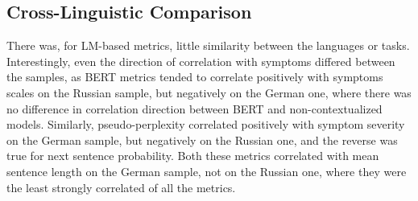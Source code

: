 

\subsection{Cross-Linguistic Comparison}









There was, for LM-based metrics, little similarity between the languages or tasks. Interestingly, even the direction of correlation with symptoms differed between the samples, as BERT metrics tended to correlate positively with symptoms scales on the Russian sample, but negatively on the German one, where there was no difference in correlation direction between BERT and non-contextualized models. Similarly, pseudo-perplexity correlated positively with symptom severity on the German sample, but negatively on the Russian one, and the reverse was true for next sentence probability. Both these metrics correlated with mean sentence length on the German sample, not on the Russian one, where they were the least strongly correlated of all the metrics.

